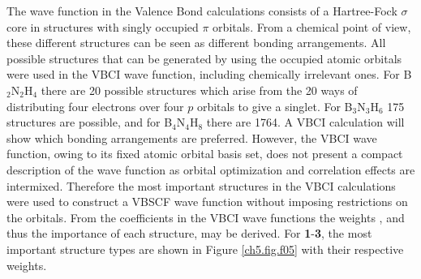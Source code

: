 The wave function in the Valence Bond calculations consists of a Hartree-Fock $\sigma$ core in structures with singly occupied
$\pi$ orbitals. From a chemical point of view, these different structures can be seen as different bonding arrangements.
All possible structures that can be generated by using the occupied atomic orbitals were used in the VBCI
wave function, including chemically irrelevant ones. For B$_2$N$_2$H$_4$ there are 20 possible structures which arise from the
20 ways of distributing four electrons over four $p$ orbitals to give a singlet. For B$_3$N$_3$H$_6$ 175 structures are possible, and
for B$_4$N$_4$H$_8$ there are 1764. A VBCI calculation will show which bonding arrangements are preferred.
However, the VBCI wave function, owing to its fixed atomic orbital basis set, does not present a compact description
of the wave function as orbital optimization and correlation effects are intermixed. Therefore the most important
structures in the VBCI calculations were used to construct a VBSCF wave function without imposing restrictions on the
orbitals. From the coefficients in the VBCI wave functions the weights \cite{r36}, and thus the importance of each structure,
may be derived. For \textbf{1}-\textbf{3}, the most important structure types are shown in Figure \ref{ch5.fig.f05} with their respective weights.
